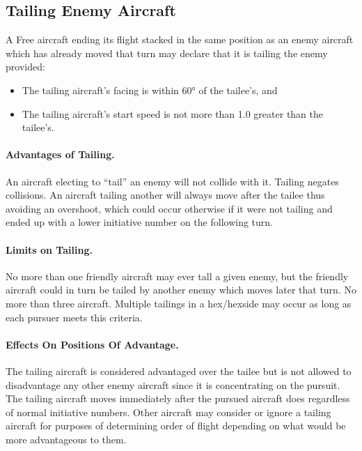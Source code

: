 \subsection{Tailing Enemy Aircraft}

A Free aircraft ending its flight stacked in the same position as an enemy aircraft which has already moved that turn may declare that it is tailing the enemy provided:

\begin{itemize}

    \item The tailing aircraft's facing is within 60° of the tailee's, and
    
    \item The tailing aircraft's start speed is not more than 1.0 greater than the tailee's.

\end{itemize}

\paragraph{Advantages of Tailing.} An aircraft electing to “tail” an enemy will not collide with it. Tailing negates collisions. An aircraft tailing another will always move after the tailee thus avoiding an overshoot, which could occur otherwise if it were not tailing and ended up with a lower initiative number on the following turn.

\paragraph{Limits on Tailing.} No more than one friendly aircraft may ever tall a given enemy, but the friendly aircraft could in turn be tailed by another enemy which moves later that turn. No more than three aircraft.  Multiple tailings in a hex/hexside may occur as long as each pursuer meets this criteria.

\paragraph{Effects On Positions Of Advantage.} The tailing aircraft is considered advantaged over the tailee but is not allowed to disadvantage any other enemy aircraft since it is concentrating on the pursuit. The tailing aircraft moves immediately after the pursued aircraft does regardless of normal initiative numbers. Other aircraft may consider or ignore a tailing aircraft for purposes of determining order of flight depending on what would be more advantageous to them.

